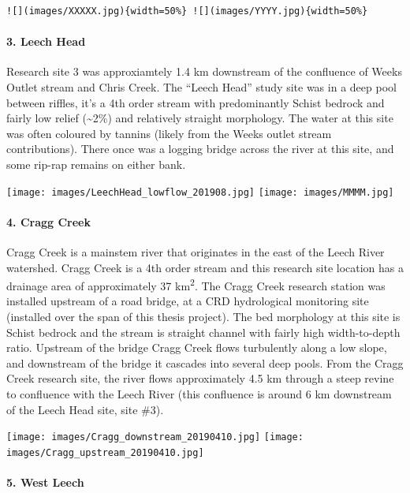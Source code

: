 \documentclass[]{article}
\let\oldparagraph\paragraph
\renewcommand{\paragraph}[1]{\oldparagraph{#1}\mbox{}}
\begin{document}
\begin{verbatim}
![](images/XXXXX.jpg){width=50%} ![](images/YYYY.jpg){width=50%}
\end{verbatim}

\paragraph{3. Leech Head}\label{leech-head}

Research site 3 was approxiamtely 1.4 km downstream of the confluence of
Weeks Outlet stream and Chris Creek. The ``Leech Head'' study site was
in a deep pool between riffles, it's a 4th order stream with
predominantly Schist bedrock and fairly low relief
(\textasciitilde{}2\%) and relatively straight morphology. The water at
this site was often coloured by tannins (likely from the Weeks outlet
stream contributions). There once was a logging bridge across the river
at this site, and some rip-rap remains on either bank.

\texttt{[image: images/LeechHead\_lowflow\_201908.jpg]}
\texttt{[image: images/MMMM.jpg]}

\paragraph{4. Cragg Creek}\label{cragg-creek}

Cragg Creek is a mainstem river that originates in the east of the Leech
River watershed. Cragg Creek is a 4th order stream and this research
site location has a drainage area of approximately 37
km\textsuperscript{2}. The Cragg Creek research station was installed
upstream of a road bridge, at a CRD hydrological monitoring site
(installed over the span of this thesis project). The bed morphology at
this site is Schist bedrock and the stream is straight channel with
fairly high width-to-depth ratio. Upstream of the bridge Cragg Creek
flows turbulently along a low slope, and downstream of the bridge it
cascades into several deep pools. From the Cragg Creek research site,
the river flows approximately 4.5 km through a steep revine to
confluence with the Leech River (this confluence is around 6 km
downstream of the Leech Head site, site \#3).

\texttt{[image: images/Cragg\_downstream\_20190410.jpg]}
\texttt{[image: images/Cragg\_upstream\_20190410.jpg]}

\paragraph{5. West Leech}\label{west-leech}
\end{document}
